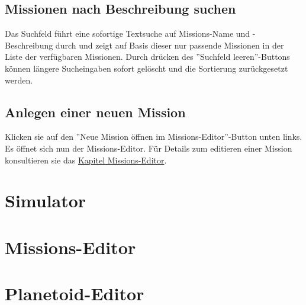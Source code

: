 \subsection{Missionen nach Beschreibung suchen}
Das Suchfeld führt eine sofortige Textsuche auf Missions-Name und -Beschreibung durch und zeigt auf Basis dieser nur passende Missionen in der Liste der verfügbaren Missionen. Durch drücken des ''Suchfeld leeren''-Buttons können längere Sucheingaben sofort gelöscht und die Sortierung zurückgesetzt werden.

\subsection{Anlegen einer neuen Mission}
Klicken sie auf den ''Neue Mission öffnen im Missions-Editor''-Button unten links.
Es öffnet sich nun der Missions-Editor.
Für Details zum editieren einer Mission konsultieren sie das \hyperlink{missioneditor}{Kapitel Missions-Editor}.

\section{Simulator}

\hypertarget{missioneditor}{\section{Missions-Editor}}

\section{Planetoid-Editor}